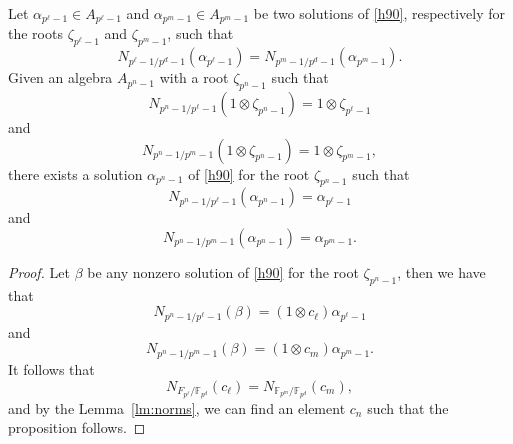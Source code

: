 \documentclass[a4paper,11pt]{article}
\begin{document}
\begin{prop}
  Let $\alpha_{p^\ell-1}\in A_{p^\ell-1}$ and $\alpha_{p^m-1}\in A_{p^m-1}$ be
  two solutions of \eqref{h90}, respectively for the roots $\zeta_{p^\ell-1}$ and
  $\zeta_{p^m-1}$, such that
  \[
    N_{p^\ell-1/p^d-1}(\alpha_{p^\ell-1})=N_{p^m-1/p^d-1}(\alpha_{p^m-1}).
  \]
  Given an algebra $A_{p^n-1}$ with a root $\zeta_{p^n-1}$ such that 
  \[
    N_{p^n-1/p^\ell-1}(1\otimes\zeta_{p^n-1})=1\otimes\zeta_{p^\ell-1}
  \]
  and
  \[
    N_{p^n-1/p^m-1}(1\otimes\zeta_{p^n-1})=1\otimes\zeta_{p^m-1},
  \]
  there exists a solution $\alpha_{p^n-1}$ of \eqref{h90} for the root $\zeta_{p^n-1}$ such that
  \[
    N_{p^n-1/p^\ell-1}(\alpha_{p^n-1})=\alpha_{p^\ell-1}
  \]
  and
  \[
    N_{p^n-1/p^m-1}(\alpha_{p^n-1})=\alpha_{p^m-1}.
  \]
\end{prop}
\begin{proof}
  Let $\beta$ be any nonzero solution of \eqref{h90} for the root
  $\zeta_{p^n-1}$, then we have that
  \[
    N_{p^n-1/p^\ell-1}(\beta)=(1\otimes c_\ell)\alpha_{p^\ell-1}
  \]
  and
  \[
    N_{p^n-1/p^m-1}(\beta)=(1\otimes c_m)\alpha_{p^m-1}.
  \]
  It follows that 
  \[
    N_{F_{p^\ell}/\mathbb{F}_{p^d}}(c_\ell)=N_{\mathbb{F}_{p^m}/\mathbb{F}_{p^d}}(c_m),
  \]
  and by the Lemma~\ref{lm:norms}, we can find an element $c_n$ such that the
  proposition follows.

\end{proof}
\end{document}
